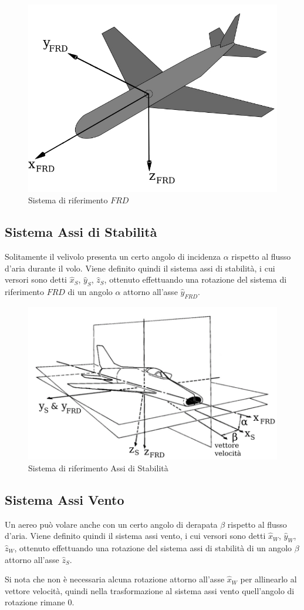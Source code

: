 \begin{figure}[H]
    \centering
    \includegraphics[width=0.42\linewidth]{Immagini/FRD.jpg}
    \caption{Sistema di riferimento $FRD$ \cite{wiki:FRD}}
\end{figure}

\subsection{Sistema Assi di Stabilità}
Solitamente il velivolo presenta un certo angolo di incidenza $\alpha$ rispetto al flusso d'aria durante il volo.
Viene definito quindi il sistema assi di stabilità, i cui versori sono detti $\hat{x}_{S}$, $\hat{y}_{S}$, $\hat{z}_{S}$, ottenuto effettuando una rotazione del sistema di riferimento $FRD$ di un angolo $\alpha$ attorno all'asse $\hat{y}_{FRD}$.

\begin{figure}[H]
    \centering
    \includegraphics[width=0.5\linewidth]{Immagini/stability.jpg}
    \caption{Sistema di riferimento Assi di Stabilità \cite{mscthesis:jetfighter}}
\end{figure}

\subsection{Sistema Assi Vento}
Un aereo può volare anche con un certo angolo di derapata $\beta$ rispetto al flusso d'aria.
Viene definito quindi il sistema assi vento, i cui versori sono detti $\hat{x}_{W}$, $\hat{y}_{W}$, $\hat{z}_{W}$, ottenuto effettuando una rotazione del sistema assi di stabilità di un angolo $\beta$ attorno all'asse $\hat{z}_{S}$.

\begin{note}
    Si nota che non è necessaria alcuna rotazione attorno all'asse $\hat{x}_{W}$ per allinearlo al vettore velocità, quindi nella trasformazione al sistema assi vento quell'angolo di rotazione rimane 0.
\end{note}
